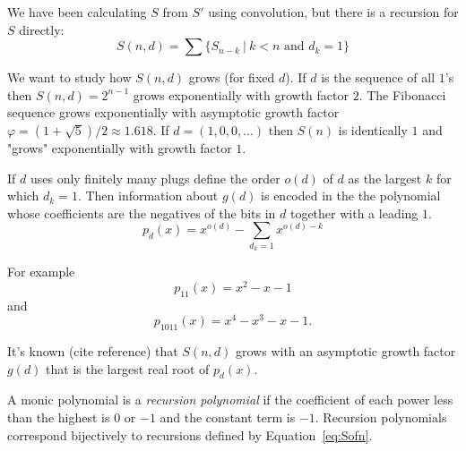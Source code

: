 \documentclass[10pt]{article}
\numberwithin{equation}{section}
\begin{document}
We have been calculating $S$ from $S'$ using convolution, but there is
a recursion for $S$ directly: 
\begin{equation}\label{eq:Sofn}
    S(n,d) = \sum\{S_{n-k} \ | \ k < n \text{ and } d_k = 1\}
\end{equation}

We want to study how $S(n,d)$ grows (for fixed $d$).
If $d$ is the sequence of all $1$'s then $S(n,d) = 2^{n-1}$ grows
exponentially with growth factor $2$. The Fibonacci sequence grows
exponentially with asymptotic growth factor $\varphi = (1+ \sqrt{5})/2
\approx 1.618$. If $d = (1, 0, 0,  \ldots)$ then $S(n)$ is identically
$1$ and "grows" exponentially with growth factor $1$. 


If $d$  uses only finitely many plugs define the order $o(d)$ of $d$
as the largest $k$ for which $d_k = 1$. Then information about $g(d)$
is encoded in the the polynomial whose coefficients are the negatives
of the bits in $d$ together with a leading $1$.
\begin{equation*}\label{eq:Sofn}
  p_d(x) = x^{o(d)} - \sum_{d_k = 1} x^{o(d)-k}
\end{equation*}

For example
  \begin{equation*}
    p_{11}(x) = x^2 - x - 1 
\end{equation*}
and
  \begin{equation*}
    p_{1011}(x) = x^4 - x^3 - x - 1 .
\end{equation*}

It's known (cite reference) that $S(n,d)$ grows with an asymptotic
growth factor $g(d)$ that is the largest real root of $p_d(x)$.

A monic polynomial is a \emph{recursion polynomial} if the coefficient
of each power less than the highest is $0$ or $-1$ and the constant
term is $-1$. Recursion polynomials correspond bijectively to
recursions defined by Equation~\ref{eq:Sofn}.
\end{document}
